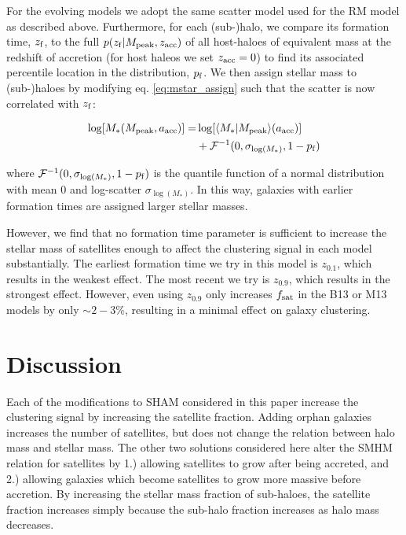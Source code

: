 \documentclass[a4paper,fleqn,usenatbib]{mnras}
\begin{document}
For the evolving models we adopt the same scatter model used for the RM model as described above.  Furthermore, for each (sub-)halo, we compare its formation time, $z_{\rm f}$, to the full $p(z_{\rm f} | M_{\rm peak}, z_{\rm acc})$ of all host-haloes of equivalent mass at the redshift of accretion (for host haleos we set $z_{\rm acc}=0$) to find its associated percentile location in the distribution, $p_{\rm f}$.  We then assign stellar mass to (sub-)haloes by modifying eq. \ref{eq:mstar_assign} such that the scatter is now correlated with $z_{\rm f}$:
%
\begin{linenomath}
\begin{align}
\log[M_*(M_{\rm peak}, a_{\rm acc})] =& \log[\langle M_* | M_{\rm peak}\rangle(a_{\rm acc})] \\ \nonumber
&+ \mathcal{F}^{-1}(0,\sigma_{\log(M_*)}, 1-p_{\rm f})
\end{align}
\end{linenomath}
%
where $\mathcal{F}^{-1}(0,\sigma_{\log(M_*)}, 1-p_{\rm f})$ is the quantile function of a normal distribution with mean 0 and log-scatter $\sigma_{\log(M_*)}$.  In this way, galaxies with earlier formation times are assigned larger stellar masses. 

However, we find that no formation time parameter is sufficient to increase the stellar mass of satellites enough to affect the clustering signal in each model substantially. The earliest formation time we try in this model is $z_{0.1}$, which results in the weakest effect.  The most recent we try is $z_{0.9}$, which results in the strongest effect. However, even using $z_{0.9}$ only increases $f_{\rm sat}$ in the B13 or M13 models by only $\sim 2-3\%$, resulting in a minimal effect on galaxy clustering.
      

\section{Discussion}

Each of the modifications to SHAM considered in this paper increase the clustering signal by increasing the satellite fraction.  Adding orphan galaxies increases the number of satellites, but does not change the relation between halo mass and stellar mass.  The other two solutions considered here alter the SMHM relation for satellites by 1.) allowing satellites to grow after being accreted, and 2.) allowing galaxies which become satellites to grow more massive before accretion.  By increasing the stellar mass fraction of sub-haloes, the satellite fraction increases simply because the sub-halo fraction increases as halo mass decreases.      
\end{document}
